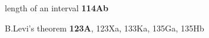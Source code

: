











length of an interval {\bf 114Ab}




B.Levi's theorem {\bf 123A}, 123Xa, 133Ka, 135Ga, 135Hb




















































\ifdim\pagewidth>467pt\fi

\tenrm=1.67pt
























